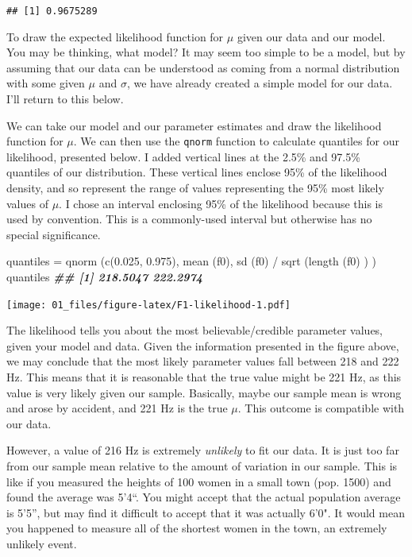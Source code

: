 \documentclass[
]{book}
\newenvironment{Shaded}{\begin{snugshade}}{\end{snugshade}}
\newcommand{\DocumentationTok}[1]{\textcolor[rgb]{0.56,0.35,0.01}{\textbf{\textit{#1}}}}
\newcommand{\FloatTok}[1]{\textcolor[rgb]{0.00,0.00,0.81}{#1}}
\newcommand{\FunctionTok}[1]{\textcolor[rgb]{0.00,0.00,0.00}{#1}}
\newcommand{\NormalTok}[1]{#1}
\newcommand{\OtherTok}[1]{\textcolor[rgb]{0.56,0.35,0.01}{#1}}
\newcommand{\SpecialCharTok}[1]{\textcolor[rgb]{0.00,0.00,0.00}{#1}}
\begin{document}
\begin{verbatim}
## [1] 0.9675289
\end{verbatim}

To draw the expected likelihood function for \(\mu\) given our data and our model. You may be thinking, what model? It may seem too simple to be a model, but by assuming that our data can be understood as coming from a normal distribution with some given \(\mu\) and \(\sigma\), we have already created a simple model for our data. I'll return to this below.

We can take our model and our parameter estimates and draw the likelihood function for \(\mu\). We can then use the \texttt{qnorm} function to calculate quantiles for our likelihood, presented below. I added vertical lines at the 2.5\% and 97.5\% quantiles of our distribution. These vertical lines enclose 95\% of the likelihood density, and so represent the range of values representing the 95\% most likely values of \(\mu\). I chose an interval enclosing 95\% of the likelihood because this is used by convention. This is a commonly-used interval but otherwise has no special significance.

\begin{Shaded}
\begin{Highlighting}[]
\NormalTok{quantiles }\OtherTok{=} \FunctionTok{qnorm}\NormalTok{ (}\FunctionTok{c}\NormalTok{(}\FloatTok{0.025}\NormalTok{, }\FloatTok{0.975}\NormalTok{), }\FunctionTok{mean}\NormalTok{ (f0), }\FunctionTok{sd}\NormalTok{ (f0) }\SpecialCharTok{/} \FunctionTok{sqrt}\NormalTok{ (}\FunctionTok{length}\NormalTok{ (f0) ) )}
\NormalTok{quantiles}
\DocumentationTok{\#\# [1] 218.5047 222.2974}
\end{Highlighting}
\end{Shaded}

\texttt{[image: 01\_files/figure-latex/F1-likelihood-1.pdf]}
~

The likelihood tells you about the most believable/credible parameter values, given your model and data. Given the information presented in the figure above, we may conclude that the most likely parameter values fall between 218 and 222 Hz. This means that it is reasonable that the true value might be 221 Hz, as this value is very likely given our sample. Basically, maybe our sample mean is wrong and arose by accident, and 221 Hz is the true \(\mu\). This outcome is compatible with our data.

However, a value of 216 Hz is extremely \emph{unlikely} to fit our data. It is just too far from our sample mean relative to the amount of variation in our sample. This is like if you measured the heights of 100 women in a small town (pop. 1500) and found the average was 5'4``. You might accept that the actual population average is 5'5'', but may find it difficult to accept that it was actually 6'0". It would mean you happened to measure all of the shortest women in the town, an extremely unlikely event.
\end{document}
